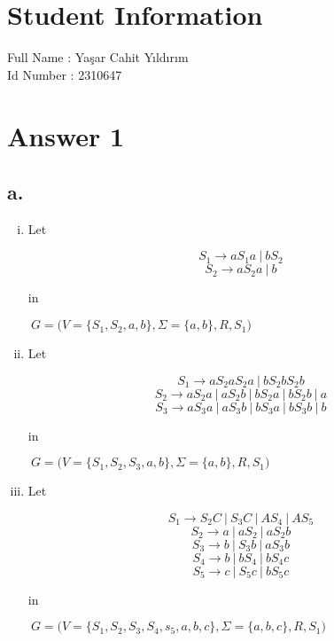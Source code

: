 \documentclass[12pt]{article}
\begin{document}
\section*{Student Information} 
Full Name : Yaşar Cahit Yıldırım \\
Id Number : 2310647
\section*{Answer 1}

\subsection*{a.}
	\begin{enumerate}[(i)]
		\item
		Let
		\begin{minipage}{0.4\textwidth}
			\vspace*{0.5cm}
			$$S_1 \rightarrow aS_1a\ |\ bS_2$$
			$$S_2 \rightarrow aS_2a\ |\ b$$
		\end{minipage}
		in 
		\begin{minipage}{0.5\textwidth}
			$\ G = \Big(V=\{S_1, S_2, a, b\}, \Sigma=\{a, b\}, R, S_1\Big)$
		\end{minipage}
		
		\item
		Let
		\begin{minipage}{0.4\textwidth}
			\vspace*{1.25cm}
			$$S_1 \rightarrow aS_2aS_2a\ |\ bS_2bS_2b$$
			$$S_2 \rightarrow aS_2a\ |\ aS_2b\ |\ bS_2a\ |\ bS_2b\ |\ a$$
			$$S_3 \rightarrow aS_3a\ |\ aS_3b\ |\ bS_3a\ |\ bS_3b\ |\ b$$
		\end{minipage}
		in 
		\begin{minipage}{0.5\textwidth}
			$\ G = \Big(V=\{S_1, S_2, S_3, a, b\}, \Sigma=\{a, b\}, R, S_1\Big)$
		\end{minipage}

		\vspace*{-1.5cm}
		
		\item
		Let
		\begin{minipage}{0.4\textwidth}
			\vspace*{2.7cm}
			$$S_1 \rightarrow S_2C\ |\ S_3C\ |\ AS_4\ |\ AS_5$$
			$$S_2 \rightarrow a\ |\ aS_2\ |\ aS_2b$$
			$$S_3 \rightarrow b\ |\ S_3b\ |\ aS_3b$$
			$$S_4 \rightarrow b\ |\ bS_4\ |\ bS_4c$$
			$$S_5 \rightarrow c\ |\ S_5c\ |\ bS_5c$$
		\end{minipage}
		\hspace{-0.75cm}
		in 
		\begin{minipage}{0.6\textwidth}
			$\ G = \Big(V=\{S_1, S_2, S_3, S_4, s_5, a, b, c\}, \Sigma=\{a, b, c\}, R, S_1\Big)$
		\end{minipage}


\end{enumerate}
\end{document}
